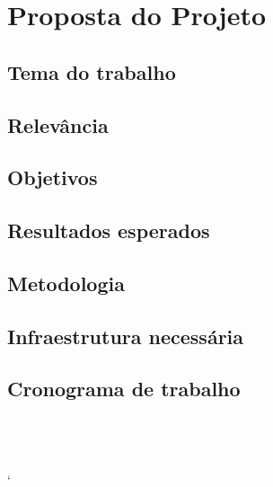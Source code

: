 \chapter{Proposta do Projeto}

\section{Tema do trabalho}
\section{Relevância}
\section{Objetivos}
\section{Resultados esperados}
\section{Metodologia}
\section{Infraestrutura necessária}
\section{Cronograma de trabalho}

\cite{Kale:2010} \\
\cite{Manferdelli:2008} \\
\cite{Dean:2008} \\
\cite{Asanovic:2009}`